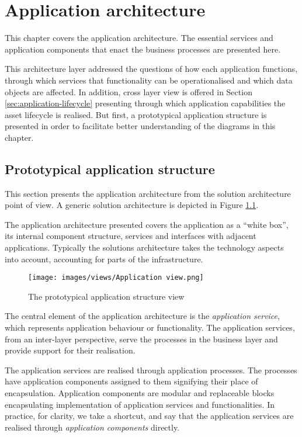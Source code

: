 \chapter{Application architecture}
\label{sec:application-architecture}
	
    This chapter covers the application architecture. The essential services and application components that enact the business processes are presented here.
    
    This architecture layer addressed the questions of how each application functions, through which services that functionality can be operationalised and which data objects are affected. In addition, cross layer view is offered in Section \ref{sec:application-lifecycle} presenting through which application capabilities the asset lifecycle is realised. But first, a prototypical application structure is presented in order to facilitate better understanding of the diagrams in this chapter. 

	\section{Prototypical application structure}
	
	This section presents the application architecture from the solution architecture point of view. A generic solution architecture is depicted in Figure \ref{fig:application-view}.
	
	The application architecture presented covers the application as a ``white box'', its internal component structure, services and interfaces with adjacent applications. Typically the solutions architecture takes the technology aspects into account, accounting for parts of the infrastructure.
	
    \begin{figure}[h]
		\centering
		\texttt{[image: images/views/Application view.png]}
		\caption{The prototypical application structure view}
		\label{fig:application-view}
	\end{figure}

	The central element of the application architecture is the \textit{application service}, which represents application behaviour or functionality. The application services, from an inter-layer perspective, serve the processes in the business layer and provide support for their realisation. 
	
	The application services are realised through application processes. The processes have application components assigned to them signifying their place of encapsulation. Application components are modular and replaceable blocks encapsulating implementation of application services and functionalities. In practice, for clarity, we take a shortcut, and say that the application services are realised through \textit{application components} directly.
	
